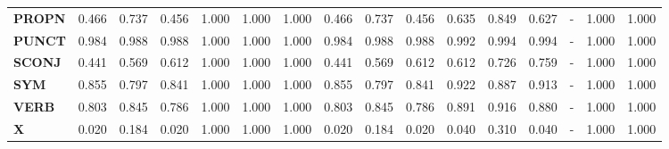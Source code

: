 \begin{table}
\begin{tabular}{|l||l||l||l||l||l||l||l||l||l||l||l||l||l||l||l|}
\textbf{PROPN} & 0.466 & 0.737 & 0.456 & 1.000 & 1.000 & 1.000 & 0.466 & 0.737 & 0.456 & 0.635 & 0.849 & 0.627 & - & 1.000 & 1.000 \\
\textbf{PUNCT} & 0.984 & 0.988 & 0.988 & 1.000 & 1.000 & 1.000 & 0.984 & 0.988 & 0.988 & 0.992 & 0.994 & 0.994 & - & 1.000 & 1.000 \\
\textbf{SCONJ} & 0.441 & 0.569 & 0.612 & 1.000 & 1.000 & 1.000 & 0.441 & 0.569 & 0.612 & 0.612 & 0.726 & 0.759 & - & 1.000 & 1.000 \\
\textbf{SYM} & 0.855 & 0.797 & 0.841 & 1.000 & 1.000 & 1.000 & 0.855 & 0.797 & 0.841 & 0.922 & 0.887 & 0.913 & - & 1.000 & 1.000 \\
\textbf{VERB} & 0.803 & 0.845 & 0.786 & 1.000 & 1.000 & 1.000 & 0.803 & 0.845 & 0.786 & 0.891 & 0.916 & 0.880 & - & 1.000 & 1.000 \\
\textbf{X} & 0.020 & 0.184 & 0.020 & 1.000 & 1.000 & 1.000 & 0.020 & 0.184 & 0.020 & 0.040 & 0.310 & 0.040 & - & 1.000 & 1.000 \\
\bottomrule
\end{tabular}
\end{table}
